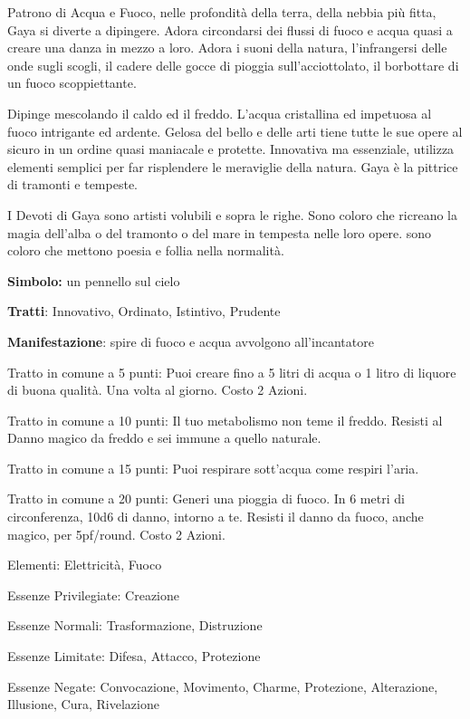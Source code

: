 \documentclass[a4paper,11pt,twoside,openany]{book}
\begin{document}
\label{gaya}

Patrono di Acqua e Fuoco, nelle profondità della terra, della nebbia più fitta, Gaya si diverte a dipingere. Adora circondarsi dei flussi di fuoco e acqua quasi a creare una danza in mezzo a loro. Adora i suoni della natura, l'infrangersi delle onde sugli scogli, il cadere delle gocce di pioggia sull'acciottolato, il borbottare di un fuoco scoppiettante.

Dipinge mescolando il caldo ed il freddo. L'acqua cristallina ed impetuosa al fuoco intrigante ed ardente. Gelosa del bello e delle arti tiene tutte le sue opere al sicuro in un ordine quasi maniacale e protette. Innovativa ma essenziale, utilizza elementi semplici per far risplendere le meraviglie della natura. Gaya è la pittrice di tramonti e tempeste.

I Devoti di Gaya sono artisti volubili e sopra le righe. Sono coloro che ricreano la magia dell'alba o del tramonto o del mare in tempesta nelle loro opere. sono coloro che mettono poesia e follia nella normalità.

\textbf{Simbolo:} un pennello sul cielo

\textbf{Tratti}: Innovativo, Ordinato, Istintivo, Prudente

\textbf{Manifestazione}: spire di fuoco e acqua avvolgono all'incantatore

\bigskip

Tratto in comune a 5 punti: Puoi creare fino a 5 litri di acqua o 1 litro di liquore di buona qualità. Una volta al giorno. Costo 2 Azioni.

Tratto in comune a 10 punti: Il tuo metabolismo non teme il freddo. Resisti al Danno magico da freddo e sei immune a quello naturale.

Tratto in comune a 15 punti: Puoi respirare sott'acqua come respiri l'aria.

Tratto in comune a 20 punti: Generi una pioggia di fuoco. In 6 metri di circonferenza, 10d6 di danno, intorno a te. Resisti il danno da fuoco, anche magico, per 5pf/round. Costo 2 Azioni.

\bigskip

Elementi: Elettricità, Fuoco

\bigskip

Essenze Privilegiate: Creazione

Essenze Normali: Trasformazione, Distruzione

Essenze Limitate: Difesa, Attacco, Protezione

Essenze Negate: Convocazione, Movimento, Charme, Protezione, Alterazione, Illusione, Cura, Rivelazione
\end{document}
